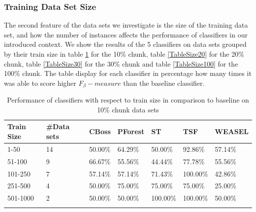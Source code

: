 

\subsubsection{Training Data Set Size}
The second feature of the data sets we investigate is the size of the training data set, and how the number of instances affects the performance of classifiers in our introduced context.
We show the results of the 5 classifiers on data sets grouped by their train size in table \ref{TableSize10} for the 10\% chunk, table \ref{TableSize20} for the 20\% chunk, table \ref{TableSize30} for the 30\% chunk and table \ref{TableSize100} for the 100\% chunk.
The table display for each classifier in percentage how many times it was able to score higher $F_{\beta}-measure$ than the baseline classifier.

\begin{table}[hbt!]
	\setlength\extrarowheight{2pt} %
	\begin{tabularx}{\textwidth}{|X|X|X|X|X|X|X|}
	\hline
	\textbf{Train Size} & \textbf{\#Data sets} & \textbf{CBoss} & \textbf{PForest} & \textbf{ST} & \textbf{TSF} & \textbf{WEASEL} \\ \hline
		1-50 & 14 & 50.00\% & 64.29\% & 50.00\% & 92.86\% & 57.14\% \\ \hline
		51-100 & 9 & 66.67\% & 55.56\% & 44.44\% & 77.78\% & 55.56\% \\ \hline
		101-250 & 7 & 57.14\% & 57.14\% & 71.43\% & 100.00\% & 42.86\% \\ \hline
		251-500 & 4 & 50.00\% & 75.00\% & 75.00\% & 75.00\% & 25.00\% \\ \hline
		501-1000 & 2 &50.00\% & 50.00\% & 100.00\% & 100.00\% & 50.00\% \\ \hline
	\caption{Performance of classifiers with respect to train size in comparison to baseline on 10\% chunk data sets}
	\label{TableSize10}
  \end{tabularx}
\end{table}

